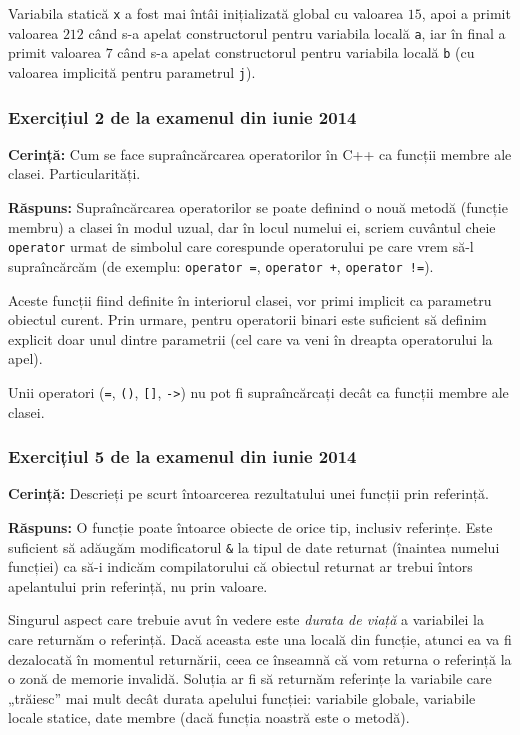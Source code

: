 Variabila statică \texttt{x} a fost mai întâi inițializată global cu valoarea \(15\), apoi a primit valoarea \(212\) când s-a apelat constructorul pentru variabila locală \texttt{a}, iar în final a primit valoarea \(7\) când s-a apelat constructorul pentru variabila locală \texttt{b} (cu valoarea implicită pentru parametrul \texttt{j}).

\subsubsection*{Exercițiul 2 de la examenul din iunie 2014}

\textbf{Cerință:} Cum se face supraîncărcarea operatorilor în C++ ca funcții membre ale clasei. Particularități.

\textbf{Răspuns:} Supraîncărcarea operatorilor se poate definind o nouă metodă (funcție membru) a clasei în modul uzual, dar în locul numelui ei, scriem cuvântul cheie \texttt{operator} urmat de simbolul care corespunde operatorului pe care vrem să-l supraîncărcăm (de exemplu: \texttt{operator =}, \texttt{operator +}, \texttt{operator !=}).

Aceste funcții fiind definite în interiorul clasei, vor primi implicit ca parametru obiectul curent. Prin urmare, pentru operatorii binari este suficient să definim explicit doar unul dintre parametrii (cel care va veni în dreapta operatorului la apel).

Unii operatori (\texttt{=}, \texttt{()}, \texttt{[]}, \texttt{->}) nu pot fi supraîncărcați decât ca funcții membre ale clasei.

\subsubsection*{Exercițiul 5 de la examenul din iunie 2014}

\textbf{Cerință:} Descrieți pe scurt întoarcerea rezultatului unei funcții prin referință.

\textbf{Răspuns:} O funcție poate întoarce obiecte de orice tip, inclusiv referințe. Este suficient să adăugăm modificatorul \texttt{\&} la tipul de date returnat (înaintea numelui funcției) ca să-i indicăm compilatorului că obiectul returnat ar trebui întors apelantului prin referință, nu prin valoare.

Singurul aspect care trebuie avut în vedere este \textit{durata de viață} a variabilei la care returnăm o referință. Dacă aceasta este una locală din funcție, atunci ea va fi dezalocată în momentul returnării, ceea ce înseamnă că vom returna o referință la o zonă de memorie invalidă. Soluția ar fi să returnăm referințe la variabile care „trăiesc” mai mult decât durata apelului funcției: variabile globale, variabile locale statice, date membre (dacă funcția noastră este o metodă).

